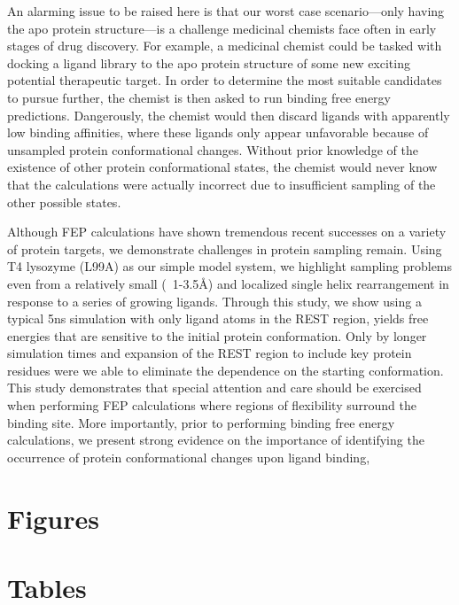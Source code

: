 \documentclass[journal=jctcce,manuscript=article]{achemso}
\begin{document}
An alarming issue to be raised here is that our worst case scenario---only having the apo protein structure---is a challenge medicinal chemists face often in early stages of drug discovery.
For example, a medicinal chemist could be tasked with docking a ligand library to the apo protein structure of some new exciting potential therapeutic target.
In order to determine the most suitable candidates to pursue further, the chemist is then asked to run binding free energy predictions. 
Dangerously, the chemist would then discard ligands with apparently low binding affinities, where these ligands only appear unfavorable because of unsampled protein conformational changes.
Without prior knowledge of the existence of other protein conformational states, the chemist would never know that the calculations were actually incorrect due to insufficient sampling of the other possible states.

Although FEP calculations have shown tremendous recent successes on a variety of protein targets\cite{FEPplus}, we demonstrate challenges in protein sampling remain. 
Using T4 lysozyme (L99A) as our simple model system, we highlight sampling problems even from a relatively small (~1-3.5\AA) and localized single helix rearrangement in response to a series of growing ligands.
Through this study, we show using a typical 5ns simulation with only ligand atoms in the REST region, yields free energies that are sensitive to the initial protein conformation. 
Only by longer simulation times and expansion of the REST region to include key protein residues were we able to eliminate the dependence on the starting conformation.
This study demonstrates that special attention and care should be exercised when performing FEP calculations where regions of flexibility surround the binding site.
More importantly, prior to performing binding free energy calculations, we present strong evidence on the importance of identifying the occurrence of protein conformational changes upon ligand binding, 


\pagebreak
\section*{Figures}



\clearpage
\section*{Tables}


\clearpage


%
\end{document}
